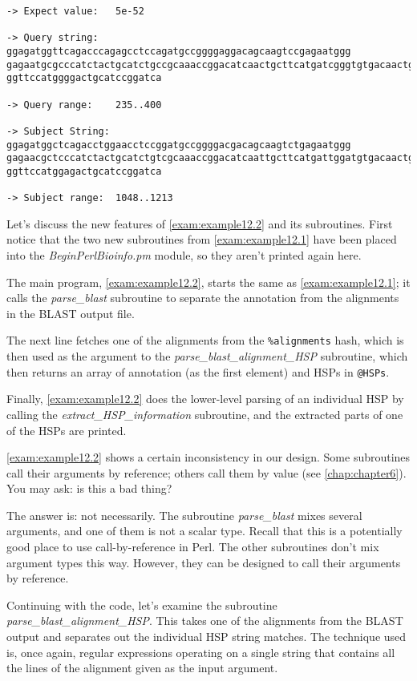 \begin{lstlisting}
-> Expect value:   5e-52

-> Query string:   ggagatggttcagacccagagcctccagatgccggggaggacagcaagtccgagaatggg
gagaatgcgcccatctactgcatctgccgcaaaccggacatcaactgcttcatgatcgggtgtgacaactgcaatgagt
ggttccatggggactgcatccggatca

-> Query range:    235..400

-> Subject String: ggagatggctcagacctggaacctccggatgccggggacgacagcaagtctgagaatggg
gagaacgctcccatctactgcatctgtcgcaaaccggacatcaattgcttcatgattggatgtgacaactgcaacgagt
ggttccatggagactgcatccggatca 

-> Subject range:  1048..1213
\end{lstlisting}

Let's discuss the new features of \autoref{exam:example12.2} and its subroutines. First notice that the two new subroutines from \autoref{exam:example12.1} have been placed into the \textit{BeginPerlBioinfo.pm} module, so they aren't printed again here.

The main program, \autoref{exam:example12.2}, starts the same as \autoref{exam:example12.1}; it calls the \textit{parse\_blast} subroutine to separate the annotation from the alignments in the BLAST output file.

The next line fetches one of the alignments from the \verb|%alignments| hash, which is then used as the argument to the \textit{parse\_blast\_alignment\_HSP} subroutine, which then returns an array of annotation (as the first element) and HSPs in \verb|@HSPs|.

Finally, \autoref{exam:example12.2} does the lower-level parsing of an individual HSP by calling the \textit{extract\_HSP\_information} subroutine, and the extracted parts of one of the HSPs are printed.

\autoref{exam:example12.2} shows a certain inconsistency in our design. Some subroutines call their arguments by reference; others call them by value (see \autoref{chap:chapter6}). You may ask: is this a bad thing?

The answer is: not necessarily. The subroutine \textit{parse\_blast} mixes several arguments, and one of them is not a scalar type. Recall that this is a potentially good place to use call-by-reference in Perl. The other subroutines don't mix argument types this way. However, they can be designed to call their arguments by reference.

Continuing with the code, let's examine the subroutine \textit{parse\_blast\_alignment\_HSP}. This takes one of the alignments from the BLAST output and separates out the individual HSP string matches. The technique used is, once again, regular expressions operating on a single string that contains all the lines of the alignment given as the input argument.

